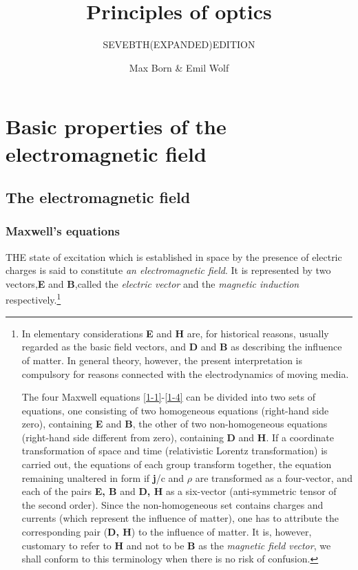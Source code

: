 \documentclass[lang=en,11pt]{elegantbook}
\title{Principles of optics}
\subtitle{SEVEBTH(EXPANDED)EDITION}
\author{Max Born \& Emil Wolf}
\institute{CAMBRIDGE UNIVERSITY PRESS}
\date{}
\begin{document}
	
	\maketitle
	
	\frontmatter
	\tableofcontents
	
	\mainmatter
	\chapter{Basic properties of the electromagnetic field}
	\section{The electromagnetic field}
	\subsection{Maxwell's equations}
	THE state of excitation which is established in space by the presence of electric charges is said to constitute \textit{an electromagnetic field}. It is represented by two vectors,\textbf{E} and \textbf{B},called the \textit{electric vector} and the \textit{magnetic induction} respectively.\footnote{In elementary considerations \textbf{E} and \textbf{H} are, for historical reasons, usually regarded as the basic field vectors, and \textbf{D} and \textbf{B} as describing the influence of matter. In general theory, however, the present interpretation is compulsory for reasons connected with the electrodynamics of moving media.\par The four Maxwell equations \eqref{1-1}-\eqref{1-4} can be divided into two sets of equations, one consisting of two homogeneous equations (right-hand side zero), containing \textbf{E} and \textbf{B}, the other of two non-homogeneous equations (right-hand side different from zero), containing \textbf{D} and \textbf{H}. If a coordinate transformation of space and time (relativistic Lorentz transformation) is carried out, the equations of each group transform together, the equation remaining unaltered in form if \textbf{j}/c and $\rho$ are transformed as a four-vector, and each of the pairs \textbf{E, B} and \textbf{D, H} as a six-vector (anti-symmetric tensor of the second order). Since the non-homogeneous set contains charges and currents (which represent the influence of matter), one has to attribute the corresponding pair (\textbf{D, H}) to the influence of matter. It is, however, customary to refer to \textbf{H} and not to be \textbf{B} as the \textit{magnetic field vector}, we shall conform to this terminology when there is no risk of confusion. }\par
\end{document}
